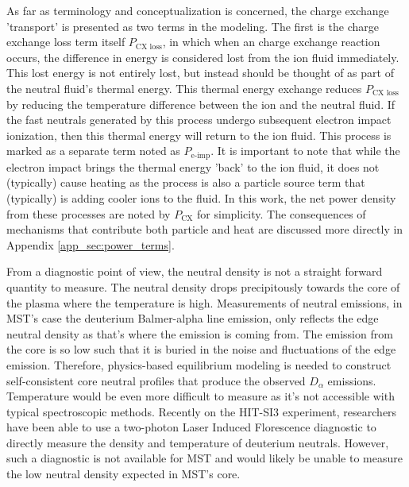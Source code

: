 \begin{refsection}
As far as terminology and conceptualization is concerned, the charge exchange 'transport' is presented as two terms in the modeling. The first is the charge exchange loss term itself $P_{\text{CX loss}}$, in which when an charge exchange reaction occurs, the difference in energy is considered lost from the ion fluid immediately. This lost energy is not entirely lost, but instead should be thought of as part of the neutral fluid's thermal energy. This thermal energy exchange reduces $P_{\text{CX loss}}$ by reducing the temperature difference between the ion and the neutral fluid. If the fast neutrals generated by this process undergo subsequent electron impact ionization, then this thermal energy will return to the ion fluid. This process is marked as a separate term noted as $P_{\text{e-imp}}$. It is important to note that while the electron impact brings the thermal energy 'back' to the ion fluid, it does not (typically) cause heating as the process is also a particle source term that (typically) is adding cooler ions to the fluid. In this work, the net power density from these processes are noted by $P_{\text{CX}}$ for simplicity. The consequences of mechanisms that contribute both particle and heat are discussed more directly in Appendix \ref{app_sec:power_terms}.

From a diagnostic point of view, the neutral density is not a straight forward quantity to measure. The neutral density drops precipitously towards the core of the plasma where the temperature is high. Measurements of neutral emissions, in MST's case the deuterium Balmer-alpha line emission, only reflects the edge neutral density as that's where the emission is coming from. The emission from the core is so low such that it is buried in the noise and fluctuations of the edge emission. Therefore, physics-based equilibrium modeling is needed to construct self-consistent core neutral profiles that produce the observed $D_{\alpha}$ emissions. Temperature would be even more difficult to measure as it's not accessible with typical spectroscopic methods. Recently on the HIT-SI3 experiment, researchers have been able to use a two-photon Laser Induced Florescence diagnostic to directly measure the density and temperature of deuterium neutrals\cite{Elliott2016}. However, such a diagnostic is not available for MST and would likely be unable to measure the low neutral density expected in MST's core. 


\end{refsection}
